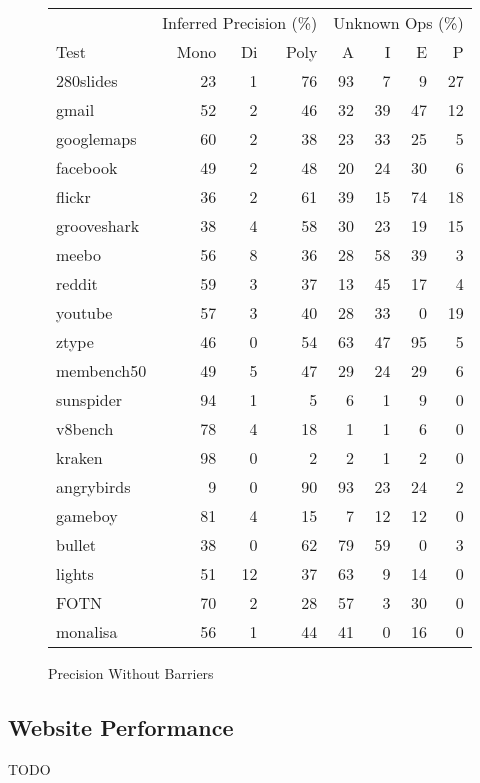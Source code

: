 \begin{figure}
\begin{center}
\begin{tabular}{lrrrrrrr}
\toprule
     & \multicolumn{3}{c}{Inferred Precision (\%)}
     & \multicolumn{4}{c}{Unknown Ops (\%)} \\
\cmidrule(r){2-4}
\cmidrule{5-8}
Test & Mono & Di & Poly & A & I & E & P \\
\midrule
280slides      & 23 & 1 & 76 & 93 & 7 & 9 & 27 \\
gmail          & 52 & 2 & 46 & 32 & 39 & 47 & 12 \\
googlemaps     & 60 & 2 & 38 & 23 & 33 & 25 & 5 \\
facebook       & 49 & 2 & 48 & 20 & 24 & 30 & 6 \\
flickr         & 36 & 2 & 61 & 39 & 15 & 74 & 18 \\
grooveshark    & 38 & 4 & 58 & 30 & 23 & 19 & 15 \\
meebo          & 56 & 8 & 36 & 28 & 58 & 39 & 3 \\
reddit         & 59 & 3 & 37 & 13 & 45 & 17 & 4 \\
youtube        & 57 & 3 & 40 & 28 & 33 & 0 & 19 \\
ztype          & 46 & 0 & 54 & 63 & 47 & 95 & 5 \\
membench50     & 49 & 5 & 47 & 29 & 24 & 29 & 6 \\
sunspider      & 94 & 1 & 5 & 6 & 1 & 9 & 0 \\
v8bench        & 78 & 4 & 18 & 1 & 1 & 6 & 0 \\
kraken         & 98 & 0 & 2 & 2 & 1 & 2 & 0 \\
angrybirds     & 9 & 0 & 90 & 93 & 23 & 24 & 2 \\
gameboy        & 81 & 4 & 15 & 7 & 12 & 12 & 0 \\
bullet         & 38 & 0 & 62 & 79 & 59 & 0 & 3 \\
lights         & 51 & 12 & 37 & 63 & 9 & 14 & 0 \\
FOTN           & 70 & 2 & 28 & 57 & 3 & 30 & 0 \\
monalisa       & 56 & 1 & 44 & 41 & 0 & 16 & 0 \\
\bottomrule
\end{tabular}
\end{center}
\nocaptionrule \caption{Precision Without Barriers}
\end{figure}

\subsection{Website Performance}

TODO

